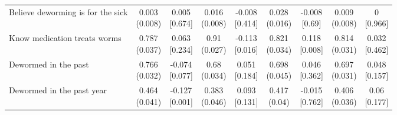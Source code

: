 {\begin{tabular}[t]{lcccccccc}
\hspace{1em}Believe deworming is for the sick & \makecell[c]{0.003\\(0.008)} & \makecell[c]{0.005\\{[0.674]}} & \makecell[c]{0.016\\(0.008)} & \makecell[c]{-0.008\\{[0.414]}} & \makecell[c]{0.028\\(0.016)} & \makecell[c]{-0.008\\{[0.69]}} & \makecell[c]{0.009\\(0.008)} & \makecell[c]{0\\{[0.966]}}\\
\hspace{1em}Know medication treats worms & \makecell[c]{0.787\\(0.037)} & \makecell[c]{0.063\\{[0.234]}} & \makecell[c]{0.91\\(0.027)} & \makecell[c]{-0.113\\{[0.016]}} & \makecell[c]{0.821\\(0.034)} & \makecell[c]{0.118\\{[0.008]}} & \makecell[c]{0.814\\(0.031)} & \makecell[c]{0.032\\{[0.462]}}\\
\hspace{1em}Dewormed in the past & \makecell[c]{0.766\\(0.032)} & \makecell[c]{-0.074\\{[0.077]}} & \makecell[c]{0.68\\(0.034)} & \makecell[c]{0.051\\{[0.184]}} & \makecell[c]{0.698\\(0.045)} & \makecell[c]{0.046\\{[0.362]}} & \makecell[c]{0.697\\(0.031)} & \makecell[c]{0.048\\{[0.157]}}\\
\hspace{1em}Dewormed in the past year & \makecell[c]{0.464\\(0.041)} & \makecell[c]{-0.127\\{[0.001]}} & \makecell[c]{0.383\\(0.046)} & \makecell[c]{0.093\\{[0.131]}} & \makecell[c]{0.417\\(0.04)} & \makecell[c]{-0.015\\{[0.762]}} & \makecell[c]{0.406\\(0.036)} & \makecell[c]{0.06\\{[0.177]}}\\

\end{tabular}}
